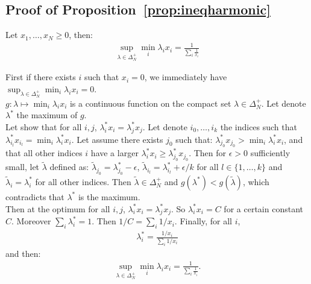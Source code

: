 \subsection{Proof of Proposition~\ref{prop:ineqharmonic}}
\label{prv:ineqharmonic}
\begin{lemma}
\label{lem:supmin}
Let $x_1,\dots,x_N\geq0$, then:
\begin{align*}
    \sup_{\lambda\in\Delta_N^{+}} \min_i\lambda_i x_i= \frac{1}{\sum_i\frac{1}{x_i}}
\end{align*}
\end{lemma}
\begin{prv*}First if there exists $i$ such that $x_i=0$, we immediately have  $\sup_{\lambda\in\Delta_N^{+}} \min_i\lambda_i x_i=0$.\\
$g:\lambda\mapsto \min_i\lambda_i x_i$ is a continuous function on the compact set $\lambda\in\Delta_N^{+}$. Let denote $\lambda^*$ the maximum of $g$. \\
Let show that for all $i,j$, $\lambda^*_ix_i=\lambda^*_jx_j$. Let denote $i_0,\dots,i_k$ the indices such that $\lambda^*_{i_l}x_{i_l}=\min_i\lambda^*_i x_i$. Let assume there exists $j_0$ such that: $\lambda^*_{j_0}x_{j_0}>\min_i\lambda^*_i x_i$, and that all  other indices $i$ have a larger $\lambda^*_i x_i\geq \lambda^*_{j_0}x_{j_0}$. Then for $\epsilon>0$ sufficiently small, let $\tilde{\lambda}$ defined as: $\tilde{\lambda}_{j_0}=\lambda
^*_{j_0}-\epsilon$, $\tilde{\lambda}_{i_l}=\lambda
^*_{i_l}+\epsilon/k$ for all $l\in\{1,\dots,k\}$ and $\tilde{\lambda}_{i}=\lambda
^*_{i}$ for all other indices. Then $\tilde{\lambda}\in\Delta_N^{+}$ and $g(\lambda^*)<g(\tilde{\lambda})$, which contradicts that $\lambda^*$ is the maximum.\\
Then at the optimum for all $i,j$, $\lambda^*_ix_i=\lambda^*_jx_j$. So $\lambda^*_ix_i=C$ for a certain constant $C$. Moreover $\sum_i\lambda^*_i=1$. Then $1/C=\sum_i1/x_i$. Finally, for all $i$, 
\begin{align*}
\lambda^*_i=\frac{1/x_i}{\sum_i1/x_i}   
\end{align*}
and then:
\begin{align*}
\sup_{\lambda\in\Delta_N^{+}} \min_i\lambda_i x_i= \frac{1}{\sum_i\frac{1}{x_i}}.
\end{align*}

\end{prv*}

